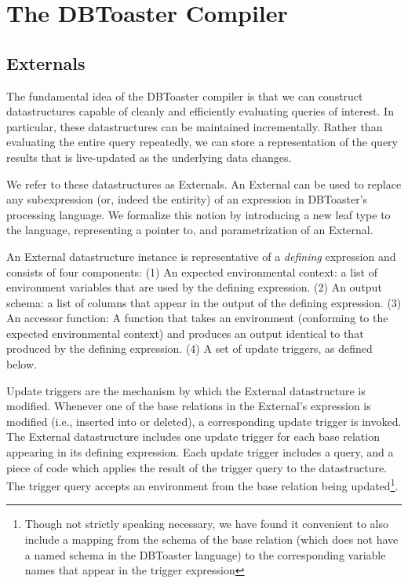 \documentclass[11pt]{amsart}
\begin{document}
\section{The DBToaster Compiler}

\subsection{Externals}
The fundamental idea of the DBToaster compiler is that we can construct datastructures capable of cleanly and efficiently evaluating queries of interest.  In particular, these datastructures can be maintained incrementally.  Rather than evaluating the entire query repeatedly, we can store a representation of the query results that is live-updated as the underlying data changes.  

We refer to these datastructures as Externals.  An External can be used to replace any subexpression (or, indeed the entirity) of an expression in DBToaster's processing language.  We formalize this notion by introducing a new leaf type to the language, representing a pointer to, and parametrization of an External.  

An External datastructure instance is representative of a {\it defining} expression and consists of four components: (1) An expected environmental context: a list of environment variables that are used by the defining expression. (2) An output schema: a list of columns that appear in the output of the defining expression.  (3) An accessor function: A function that takes an environment (conforming to the expected environmental context) and produces an output identical to that produced by the defining expression.  (4) A set of update triggers, as defined below.

Update triggers are the mechanism by which the External datastructure is modified.  Whenever one of the base relations in the External's expression is modified (i.e., inserted into or deleted), a corresponding update trigger is invoked.  The External datastructure includes one update trigger for each base relation appearing in its defining expression.  Each update trigger includes a query, and a piece of code which applies the result of the trigger query to the datastructure.  The trigger query accepts an environment from the base relation being updated\footnote{Though not strictly speaking necessary, we have found it convenient to also include a mapping from the schema of the base relation (which does not have a named schema in the DBToaster language) to the corresponding variable names that appear in the trigger expression}.
\end{document}
